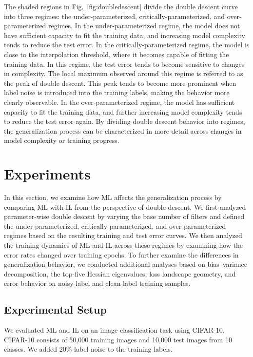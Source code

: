 \documentclass[dvipdfmx]{nolta}
\begin{document}
The shaded regions in Fig.~\ref{fig:doubledescent} divide the double descent curve into three regimes: the under-parameterized, critically-parameterized, and over-parameterized regimes. In the under-parameterized regime, the model does not have sufficient capacity to fit the training data, and increasing model complexity tends to reduce the test error. In the critically-parameterized regime, the model is close to the interpolation threshold, where it becomes capable of fitting the training data. In this regime, the test error tends to become sensitive to changes in complexity. The local maximum observed around this regime is referred to as the peak of double descent. This peak tends to become more prominent when label noise is introduced into the training labels, making the behavior more clearly observable. In the over-parameterized regime, the model has sufficient capacity to fit the training data, and further increasing model complexity tends to reduce the test error again. By dividing double descent behavior into regimes, the generalization process can be characterized in more detail across changes in model complexity or training progress.

\section{Experiments}
In this section, we examine how ML affects the generalization process by comparing ML with IL from the perspective of double descent. We first analyzed parameter-wise double descent by varying the base number of filters and defined the under-parameterized, critically-parameterized, and over-parameterized regimes based on the resulting training and test error curves. We then analyzed the training dynamics of ML and IL across these regimes by examining how the error rates changed over training epochs. To further examine the differences in generalization behavior, we conducted additional analyses based on bias--variance decomposition, the top-five Hessian eigenvalues, loss landscape geometry, and error behavior on noisy-label and clean-label training samples.

\subsection{Experimental Setup}
We evaluated ML and IL on an image classification task using CIFAR-10\cite{krizhevsky_learning_2009}.
CIFAR-10 consists of 50,000 training images and 10,000 test images from 10 classes.
We added 20\% label noise to the training labels.
\end{document}

